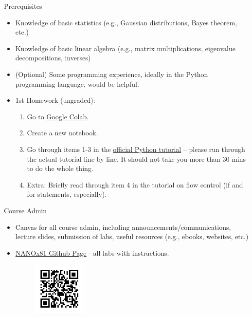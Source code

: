 \documentclass[aspectratio=169]{beamer}
\begin{document}
\begin{frame}{Prerequisites}
    \begin{itemize}
        \item Knowledge of basic statistics (e.g., Gaussian distributions, Bayes theorem, etc.)
        \item Knowledge of basic linear algebra (e.g., matrix multiplications, eigenvalue decompositions, inverses)
        \item (Optional) Some programming experience, ideally in the Python programming language, would be helpful.
        \item 1st Homework (ungraded):
        \begin{enumerate}
            \item Go to \href{https://colab.research.google.com/}{Google Colab}.
            \item Create a new notebook.
            \item Go through items 1-3 in the \href{http://docs.python.org/3/tutorial/}{official Python tutorial} – please run through the actual tutorial line by line. It should not take you more than 30 mins to do the whole thing.
            \item Extra: Briefly read through item 4 in the tutorial on flow control (if and for statements, especially).
        \end{enumerate}
    \end{itemize}
\end{frame}

\begin{frame}{Course Admin}
    \begin{itemize}
        \item Canvas for all course admin, including announcements/communications, lecture slides, submission of labs, useful resources (e.g., ebooks, websites, etc.)
        \item \href{https://github.com/materialsvirtuallab/nano281}{NANOx81 Github Page} - all labs with instructions.
        \begin{figure}
            \centering
            \includegraphics[width=0.25\textwidth]{figures/QR-NANO281Github.png}
            \label{fig:my_label}
        \end{figure}
    \end{itemize}
\end{frame}
\end{document}
